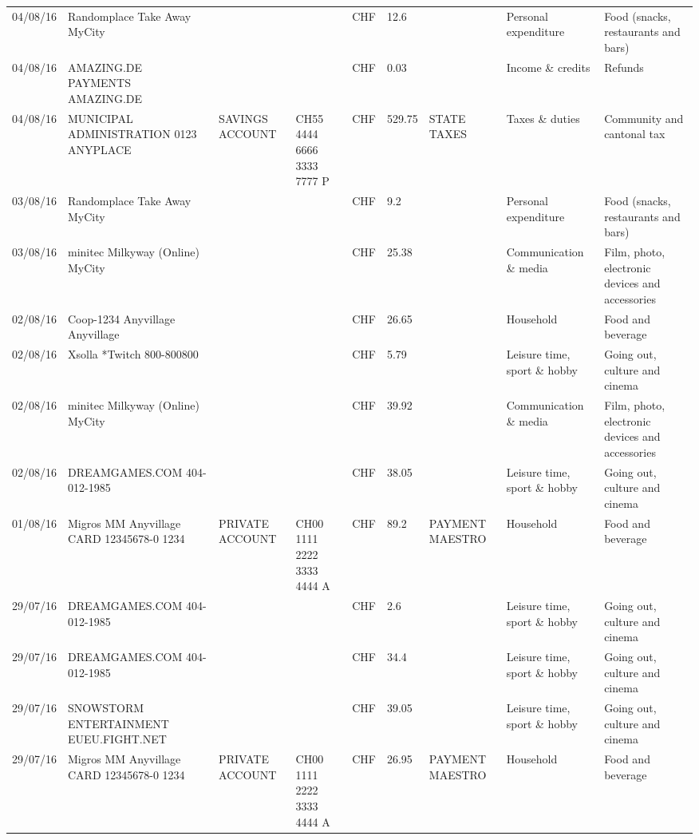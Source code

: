 \begin{landscape}
\begin{table}[t]
\begin{center}
\begin{tabular}{lllllllll}
		04/08/16 & Randomplace Take Away     MyCity &       &       & CHF   & 12.6  &       & Personal expenditure & Food (snacks, restaurants and bars) \\
		04/08/16 & AMAZING.DE PAYMENTS       AMAZING.DE &       &       & CHF   & 0.03  &       & Income \& credits & Refunds \\
		04/08/16 & MUNICIPAL ADMINISTRATION 0123 ANYPLACE & SAVINGS ACCOUNT & CH55 4444 6666 3333 7777 P & CHF   & 529.75 & STATE TAXES & Taxes \& duties & Community and cantonal tax \\
		03/08/16 & Randomplace Take Away     MyCity &       &       & CHF   & 9.2   &       & Personal expenditure & Food (snacks, restaurants and bars) \\
		03/08/16 & minitec Milkyway (Online) MyCity &       &       & CHF   & 25.38 &       & Communication \& media & Film, photo, electronic devices and accessories \\
		02/08/16 & Coop-1234 Anyvillage    Anyvillage &       &       & CHF   & 26.65 &       & Household & Food and beverage \\
		02/08/16 & Xsolla *Twitch           800-800800 &       &       & CHF   & 5.79  &       & Leisure time, sport \& hobby & Going out, culture and cinema \\
		02/08/16 & minitec Milkyway (Online) MyCity &       &       & CHF   & 39.92 &       & Communication \& media & Film, photo, electronic devices and accessories \\
		02/08/16 & DREAMGAMES.COM           404-012-1985 &       &       & CHF   & 38.05 &       & Leisure time, sport \& hobby & Going out, culture and cinema \\
		01/08/16 & Migros MM Anyvillage CARD 12345678-0 1234 & PRIVATE ACCOUNT & CH00 1111 2222 3333 4444 A & CHF   & 89.2  & PAYMENT MAESTRO & Household & Food and beverage \\
		29/07/16 & DREAMGAMES.COM           404-012-1985 &       &       & CHF   & 2.6   &       & Leisure time, sport \& hobby & Going out, culture and cinema \\
		29/07/16 & DREAMGAMES.COM           404-012-1985 &       &       & CHF   & 34.4  &       & Leisure time, sport \& hobby & Going out, culture and cinema \\
		29/07/16 & SNOWSTORM ENTERTAINMENT EUEU.FIGHT.NET &       &       & CHF   & 39.05 &       & Leisure time, sport \& hobby & Going out, culture and cinema \\
		29/07/16 & Migros MM Anyvillage CARD 12345678-0 1234 & PRIVATE ACCOUNT & CH00 1111 2222 3333 4444 A & CHF   & 26.95 & PAYMENT MAESTRO & Household & Food and beverage \\

\end{tabular}
\end{center}
\end{table}
\end{landscape}
